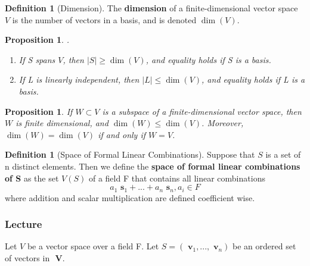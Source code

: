 \documentclass[12pt]{article}
\newtheorem{prop}[thm]{Proposition}
\theoremstyle{definition}
\newtheorem{defn}[thm]{Definition}
\theoremstyle{remark}
\numberwithin{equation}{section}
\newcommand\B[1]{\textbf{ #1}}
\begin{document}
\vspace{15pt}

\begin{defn}[Dimension]
        The \B{dimension} of a finite-dimensional vector space $V$ is the number of vectors in a basis, and is denoted $\dim(V)$.
\end{defn}


\vspace{15pt}

\begin{prop}
        .\newline \begin{enumerate}
                \item If S spans $V$, then $|S| \geq \dim(V)$, and equality holds if S is a basis.
                \item If L is linearly independent, then $|L| \leq \dim(V)$, and equality holds if L is a basis.
        \end{enumerate}
\end{prop}

\vspace{15pt}

\begin{prop}
        If $W \subset V$ is a subspace of a finite-dimensional vector space, then $W$ is finite dimensional, and $\dim(W) \leq \dim(V)$. Moreover, $\dim(W) = \dim(V)$ if and only if $W = V$.
\end{prop}


\vspace{15pt}

\begin{defn}[Space of Formal Linear Combinations]
        Suppose that $S$ is a set of n distinct elements. Then we define the \B{space of formal linear combinations of S} as the set $V(S)$ of a field F that contains all linear combinations \begin{equation}
                a_1\B{s}_1+...+a_n\B{s}_n, a_i \in F
        \end{equation}
        where addition and scalar multiplication are defined coefficient wise.
\end{defn}

\vspace{15pt}

\subsubsection{Lecture}

Let $V$ be a vector space over a field F. Let $S = (\B{v}_1,...,\B{v}_n)$ be an ordered set of vectors in $\B{V}$.
\end{document}
